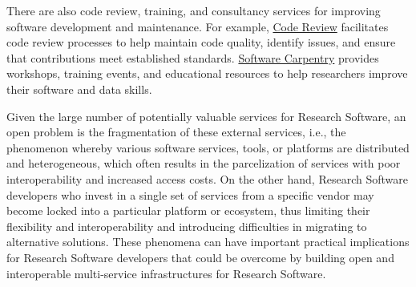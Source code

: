 There are also code review, training, and consultancy services for improving software development and maintenance. For example, \href{https://www.reviewboard.org/}{Code Review} facilitates code review processes to help maintain code quality, identify issues, and ensure that contributions meet established standards. \href{https://software-carpentry.org/}{Software Carpentry} provides workshops, training events, and educational resources to help researchers improve their software and data skills.

Given the large number of potentially valuable services for Research Software, an open problem is the fragmentation of these external services, i.e., the phenomenon whereby various software services, tools, or platforms are distributed and heterogeneous, which often results in the parcelization of services with poor interoperability and increased access costs. On the other hand, Research Software developers who invest in a single set of services from a specific vendor may become locked into a particular platform or ecosystem, thus limiting their flexibility and interoperability and introducing difficulties in migrating to alternative solutions. These phenomena can have important practical implications for Research Software developers that could be overcome by building open and interoperable multi-service infrastructures for Research Software.
